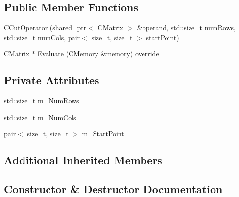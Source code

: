 \subsection*{Public Member Functions}
\begin{DoxyCompactItemize}
\item 
\hyperlink{classCCutOperator_a821d6a50def27608e635434e3ca73432}{C\+Cut\+Operator} (shared\+\_\+ptr$<$ \hyperlink{classCMatrix}{C\+Matrix} $>$ \&operand, std\+::size\+\_\+t num\+Rows, std\+::size\+\_\+t num\+Cols, pair$<$ size\+\_\+t, size\+\_\+t $>$ start\+Point)
\item 
\hyperlink{classCMatrix}{C\+Matrix} $\ast$ \hyperlink{classCCutOperator_ad401b31051d8b245cc0258d773f4f816}{Evaluate} (\hyperlink{classCMemory}{C\+Memory} \&memory) override
\end{DoxyCompactItemize}
\subsection*{Private Attributes}
\begin{DoxyCompactItemize}
\item 
std\+::size\+\_\+t \hyperlink{classCCutOperator_af8d34f5712a90c9969823f75a719dc1b}{m\+\_\+\+Num\+Rows}
\item 
std\+::size\+\_\+t \hyperlink{classCCutOperator_a79665dc45c36827946d70561b17972e1}{m\+\_\+\+Num\+Cols}
\item 
pair$<$ size\+\_\+t, size\+\_\+t $>$ \hyperlink{classCCutOperator_aa58b7138e83bd58cc64f8fac3325ce80}{m\+\_\+\+Start\+Point}
\end{DoxyCompactItemize}
\subsection*{Additional Inherited Members}


\subsection{Constructor \& Destructor Documentation}
